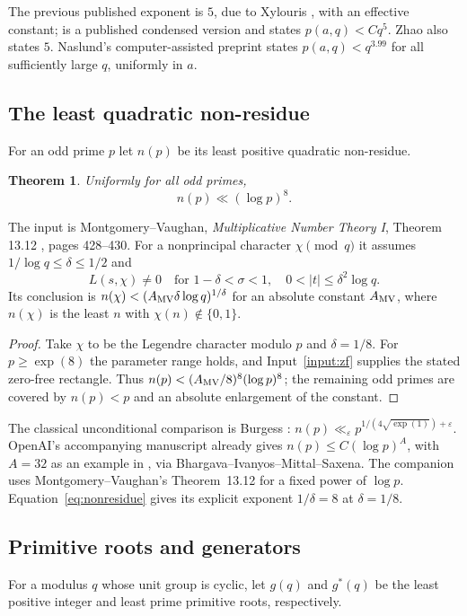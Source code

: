 \documentclass[11pt]{article}
\newtheorem{theorem}{Theorem}[section]
\theoremstyle{definition}
\begin{document}
The previous published exponent is $5$, due to Xylouris
\cite[Theorem~2.1]{Xylouris2011}, with an effective constant;
\cite[Theorem~1]{Xylouris2018} is a published condensed version
and states $p(a,q)<Cq^5$. Zhao \cite[Theorem~1.4]{Zhao2026} also
states $5$. Naslund's computer-assisted preprint \cite{Naslund2026}
states $p(a,q)<q^{3.99}$ for all sufficiently large $q$, uniformly in $a$.

\subsection{The least quadratic non-residue}
For an odd prime $p$ let $n(p)$ be its least positive quadratic
non-residue.

\begin{theorem}\label{thm:nonresidue}
Uniformly for all odd primes,
\begin{equation}\label{eq:nonresidue}
 n(p)\ll(\log p)^8.
\end{equation}
\end{theorem}

The input is Montgomery--Vaughan, \emph{Multiplicative Number Theory I},
Theorem 13.12 \cite{MV}, pages 428--430.
For a nonprincipal character $\chi\pmod q$ it assumes
$1/\log q\le\delta\le1/2$ and
\[
 L(s,\chi)\ne0\quad\text{for }1-\delta<\sigma<1,
                      \quad0<|t|\le\delta^2\log q.
\]
Its conclusion is
$n(\chi)<(A_{\rm MV}\delta\log q)^{1/\delta}$ for an absolute constant
$A_{\rm MV}$, where $n(\chi)$ is the least $n$ with
$\chi(n)\notin\{0,1\}$.
\begin{proof}
Take $\chi$ to be the Legendre character modulo $p$ and
$\delta=1/8$. For $p\ge\exp(8)$ the parameter range holds, and
Input~\ref{input:zf} supplies the stated zero-free rectangle.
Thus $n(p)<(A_{\rm MV}/8)^8(\log p)^8$; the remaining odd primes
are covered by $n(p)<p$ and an absolute enlargement of the constant.
\end{proof}
The classical unconditional comparison is Burgess
\cite[Theorem 2]{Burgess1957}:
$n(p)\ll_\varepsilon p^{1/(4\sqrt{\exp(1)})+\varepsilon}$.
OpenAI's accompanying manuscript already gives
$n(p)\le C(\log p)^A$, with $A=32$ as an example in
\cite[Corollary~1.2]{OpenAIQ78}, via Bhargava--Ivanyos--Mittal--Saxena.
The companion \cite{OpenAIQ1112} uses Montgomery--Vaughan's
Theorem~13.12 for a fixed power of $\log p$.
Equation~\eqref{eq:nonresidue} gives its explicit exponent
$1/\delta=8$ at $\delta=1/8$.


\subsection{Primitive roots and generators}
For a modulus $q$ whose unit group is cyclic, let $g(q)$ and $g^*(q)$
be the least positive integer and least prime primitive roots, respectively.
\end{document}
